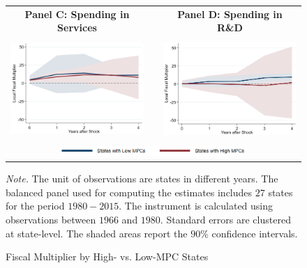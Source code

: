 \documentclass[dv_diss_main.tex]{subfiles}
\begin{document}
\begin{figure}[ht]
\begin{center}
\begin{tabular}[c]{ccc}
    \normalsize{\bf Panel C: Spending in Services} & & \normalsize{\bf Panel D: Spending in R\&D} \\
    {\includegraphics[height=1.5in,width=2.8in]{figures/graph_mpc_services.png}} & & {\includegraphics[height=1.5in,width=2.8in]{figures/graph_mpc_rd.png}} \\[0.1in]
    
    \multicolumn{3}{c}{\includegraphics[height=0.15in,width=2.8in]{figures/graph_mpc_legend.png}} \\[0.1in]

    
    \end{tabular}
    \end{center}
    
    
    
    \caption{Fiscal Multiplier by High- vs. Low-MPC States}
    
    \footnotesize{\textit{Note. } The unit of observations are states in different years. The balanced panel used for computing the estimates includes $27$ states for the period $1980-2015$. The instrument is calculated using observations between $1966$ and $1980$. Standard errors are clustered at state-level. The shaded areas report the $90\%$ confidence intervals.}

    \label{fig:mpc}
\end{figure}
\newpage
\end{document}
